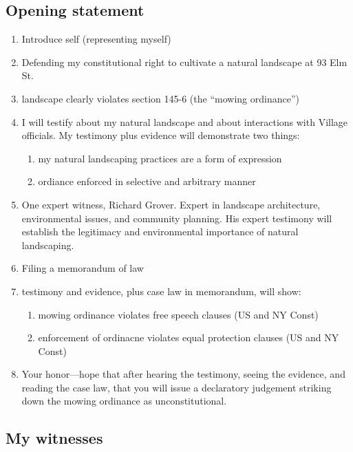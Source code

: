 \documentclass[12pt]{article}
\begin{document}
\subsection{Opening statement}
\begin{enumerate}
\item Introduce self (representing myself)
\item Defending my constitutional right to cultivate a natural landscape at 93 Elm St.
\item landscape clearly violates section 145-6 (the ``mowing ordinance'')
\item I will testify about my natural landscape and about interactions with Village officials.
My testimony plus evidence will demonstrate two things:
        \begin{enumerate}
        \item my natural landscaping practices are a form of expression
        \item ordiance enforced in selective and arbitrary manner
        \end{enumerate}
\item One expert witness, Richard Grover.
Expert in landscape architecture, environmental issues, and community planning.
His expert testimony will  establish the legitimacy and environmental importance of natural landscaping.

\item Filing a memorandum of law

\item testimony and evidence, plus case law in memorandum, will show:
      \begin{enumerate}
      \item mowing ordinance violates free speech clauses (US and NY Const)
      \item enforcement of ordinacne violates equal protection clauses (US and NY Const)
      \end{enumerate}

\item Your honor---hope that after hearing the testimony, seeing the evidence, and reading the case law, that you will issue a declaratory judgement striking down the mowing ordinance as unconstitutional.
\end{enumerate}


\subsection{My witnesses}
\end{document}
